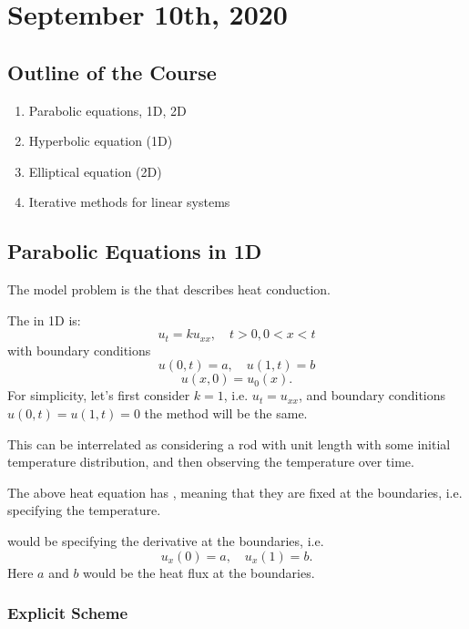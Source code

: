 \documentclass[../main/main.tex]{subfiles}
\begin{document}
\section{September 10th, 2020}
\subsection{Outline of the Course}
\begin{enumerate}
    \item Parabolic equations, 1D, 2D
    \item Hyperbolic equation (1D) 
    \item Elliptical equation (2D)
    \item Iterative methods for linear systems 
\end{enumerate}
\subsection{Parabolic Equations in 1D}
The model problem is the  that describes heat conduction.

\begin{definition}
    The  in 1D is: \[
    u_t = k u_{xx}, \quad t> 0, 0<x<t
    \] with boundary conditions \[
    u(0,t) = a, \quad u(1,t) = b
    \] \[
    u(x,0) = u_0(x)
    .\] 
    For simplicity, let's first consider $k=1$, i.e. $u_t = u_{x x}$, and boundary conditions $u(0,t) = u(1,t) = 0$ the method will be the same.
\end{definition}
 This can be interrelated as considering a rod with unit length with some initial temperature distribution, and then observing the temperature over time. 

 \begin{definition}
     The above heat equation has , meaning that they are fixed at the boundaries, i.e. specifying the temperature. 
 \end{definition}

 \begin{definition}
      would be specifying the derivative at the boundaries, i.e. \[
         u_x(0) = a, \quad u_x(1) = b
     .\] Here $a$ and $b$ would be the heat flux at the boundaries.
 \end{definition}

 \subsubsection{Explicit Scheme}
\end{document}
